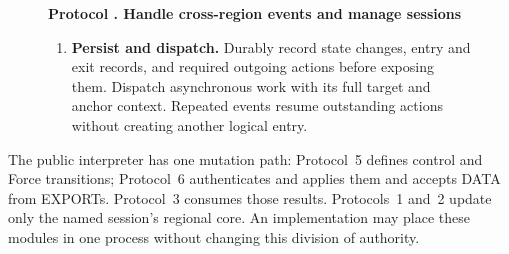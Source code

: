 \documentclass[11pt,a4paper]{article}
\newcounter{protocol}
\newenvironment{protocol}[3][htbp]{\begin{figure}[#1]\refstepcounter{protocol}\label{#2}
\begin{mdframed}[linewidth=.6pt,skipabove=0pt,skipbelow=0pt,
innertopmargin=7pt,innerbottommargin=7pt]\small
\textbf{Protocol \theprotocol. #3}\par\smallskip}{\end{mdframed}\end{figure}}
\begin{document}
\begin{protocol}[H]{alg:rotation}{Handle cross-region events and manage sessions}
\begin{enumerate}[label=\textbf{\arabic*)},itemsep=3pt]
program with a fixed handoff, check \cref{def:ready}. In the same local
event, recheck public validity and the durable entry flag, record Ready,
and invoke Protocol~4 Enter atomically. A failed check leaves Waiting
or applies a justified cancellation; it does not partially initialize
the engine.
\item \textbf{Persist and dispatch.} Durably record state changes,
entry and exit records, and required outgoing actions before exposing
them. Dispatch asynchronous work with its full target and anchor
context. Repeated events resume outstanding actions without creating
another logical entry.
\end{enumerate}
\end{protocol}

The public interpreter has one mutation path: Protocol~5 defines
control and Force transitions; Protocol~6 authenticates and
applies them and accepts DATA from EXPORTs. Protocol~3 consumes those results.
Protocols~1 and~2 update only the named session's regional core.
An implementation may place these modules in one process without
changing this division of authority.
\end{document}
